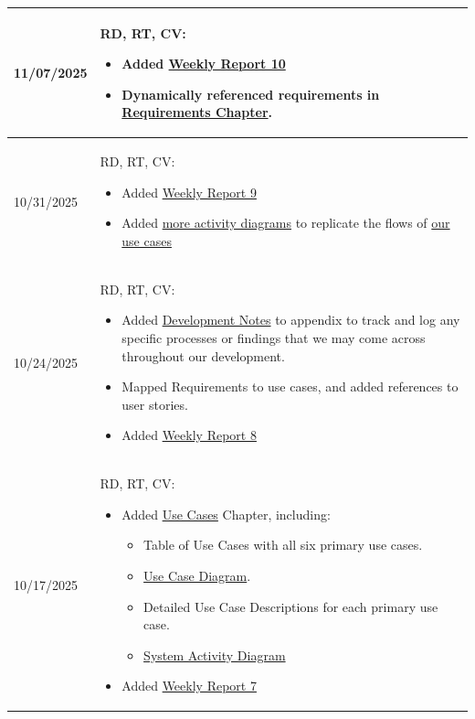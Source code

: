 \begin{longtable}{|l||p{13.5cm}|}
11/07/2025 & RD, RT, CV:
\begin{itemize}[topsep=0pt,itemsep=0pt,parsep=0pt,partopsep=0pt,leftmargin=12pt]
    \item Added \hyperref[sec:report10]{Weekly Report 10}
    \item Dynamically referenced requirements in \hyperref[Chapter::Requirements]{Requirements Chapter}.
\end{itemize}
\\ \hline


10/31/2025 & RD, RT, CV:
\begin{itemize}[topsep=0pt,itemsep=0pt,parsep=0pt,partopsep=0pt,leftmargin=12pt]
    \item Added \hyperref[sec:report9]{Weekly Report 9}
    \item Added \hyperref[section::activityDiagrams]{more activity diagrams} to replicate the flows of \hyperref[section::useCaseDescriptions]{our use cases}
\end{itemize}
\\ \hline


10/24/2025 & RD, RT, CV:
\begin{itemize}[topsep=0pt,itemsep=0pt,parsep=0pt,partopsep=0pt,leftmargin=12pt]
    \item Added \hyperref[Chapter::DevelopmentNotes]{Development Notes} to appendix to track and log any specific processes or findings that we may come across throughout our development.
    \item Mapped Requirements to use cases, and added references to user stories.
    \item Added \hyperref[sec:report8]{Weekly Report 8}
\end{itemize}
\\ \hline

10/17/2025 & RD, RT, CV:
\begin{itemize}[topsep=0pt,itemsep=0pt,parsep=0pt,partopsep=0pt,leftmargin=12pt]
    \item Added \hyperref[Chapter::UseCases]{Use Cases} Chapter, including:
        \begin{itemize}[topsep=0pt,itemsep=0pt,parsep=0pt,partopsep=0pt,leftmargin=12pt]
            \item Table of Use Cases with all six primary use cases.
            \item \hyperref[fig:finditUseCases]{Use Case Diagram}.
            \item Detailed Use Case Descriptions for each primary use case.
            \item \hyperref[fig:finditActivity1]{System Activity Diagram}
        \end{itemize}
    \item Added \hyperref[sec:report7]{Weekly Report 7}
\end{itemize}
\\ \hline



\end{longtable}
